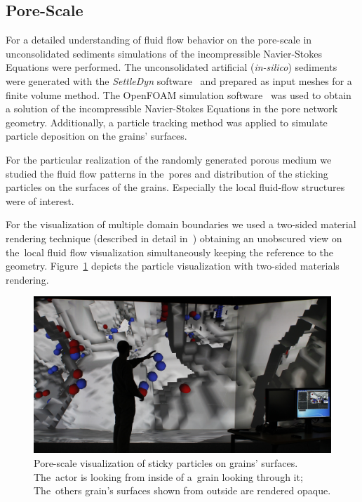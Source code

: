 \documentclass[twocolumn]{svjour3}          %
\begin{document}
\subsection{Pore-Scale}
\label{pore-scale}

For a detailed understanding of fluid flow behavior on the pore-scale in unconsolidated sediments simulations of the incompressible Navier-Stokes Equations were performed. The unconsolidated artificial (\emph{in-silico}) sediments were generated with the \emph{SettleDyn} software~\cite{web:SettleDyn} and prepared as input meshes for a finite volume method. The OpenFOAM simulation software~\cite{web:OpenFOAM} was used to obtain a solution of the incompressible Navier-Stokes Equations in the pore network geometry. Additionally, a particle tracking method was applied to simulate particle deposition on the grains' surfaces.

For the particular realization of the randomly generated porous medium we studied the fluid flow patterns in the~pores and distribution of the sticking particles on the surfaces of the grains. Especially the local fluid-flow structures were of interest.

For the visualization of multiple domain boundaries we used a two-sided material rendering technique (described in detail in~\cite{naumov:twosidedrendering}) obtaining an unobscured view on the~local fluid flow visualization simultaneously keeping the reference to the geometry. Figure~\ref{fig:porescale} depicts the particle visualization with
two-sided materials rendering.

\begin{figure}[htb]
  \includegraphics[width=\linewidth]{images/porescale_vislab.jpg}
  \caption{Pore-scale visualization of sticky particles on grains' surfaces.
  The~actor is looking from inside of a~grain looking through it; The~others
  grain's surfaces shown from outside are rendered opaque.}
\label{fig:porescale}
\end{figure}
\end{document}
